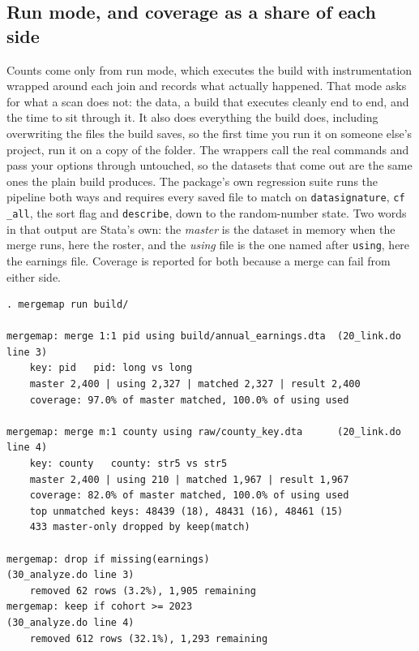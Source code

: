 \documentclass[
    a4paper,
    fontsize=10pt,
    twoside=true,
    numbers=noenddot,
]{kaobook}
\begin{document}
\subsection{Run mode, and coverage as a share of each side}
Counts come only from run mode, which executes the build with instrumentation wrapped around each join and records what actually happened. That mode asks for what a scan does not: the data, a build that executes cleanly end to end, and the time to sit through it. It also does everything the build does, including overwriting the files the build saves, so the first time you run it on someone else's project, run it on a copy of the folder. The wrappers call the real commands and pass your options through untouched, so the datasets that come out are the same ones the plain build produces. The package's own regression suite runs the pipeline both ways and requires every saved file to match on \texttt{datasignature}, \texttt{cf \_all}, the sort flag and \texttt{describe}, down to the random-number state. Two words in that output are Stata's own: the \emph{master} is the dataset in memory when the merge runs, here the roster, and the \emph{using} file is the one named after \texttt{using}, here the earnings file. Coverage is reported for both because a merge can fail from either side.
\par
{\footnotesize
\begin{verbatim}
. mergemap run build/

mergemap: merge 1:1 pid using build/annual_earnings.dta  (20_link.do line 3)
    key: pid   pid: long vs long
    master 2,400 | using 2,327 | matched 2,327 | result 2,400
    coverage: 97.0% of master matched, 100.0% of using used

mergemap: merge m:1 county using raw/county_key.dta      (20_link.do line 4)
    key: county   county: str5 vs str5
    master 2,400 | using 210 | matched 1,967 | result 1,967
    coverage: 82.0% of master matched, 100.0% of using used
    top unmatched keys: 48439 (18), 48431 (16), 48461 (15)
    433 master-only dropped by keep(match)

mergemap: drop if missing(earnings)                      (30_analyze.do line 3)
    removed 62 rows (3.2%), 1,905 remaining
mergemap: keep if cohort >= 2023                         (30_analyze.do line 4)
    removed 612 rows (32.1%), 1,293 remaining
\end{verbatim}
}
\end{document}
